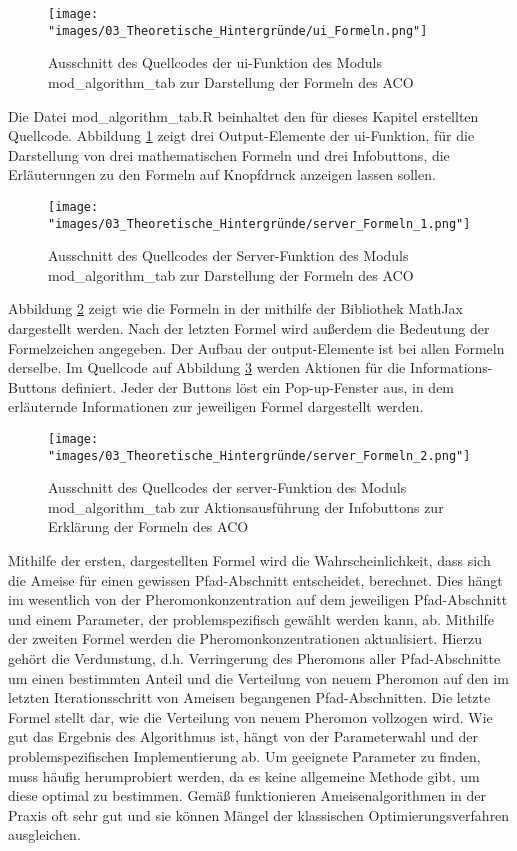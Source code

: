 \begin{figure}[h]
 \centering
 \texttt{[image: "images/03\_Theoretische\_Hintergründe/ui\_Formeln.png"]}
 \caption{Ausschnitt des Quellcodes der ui-Funktion des Moduls mod\_algorithm\_tab zur Darstellung der Formeln des ACO}
 \label{fig:formeln_ui}
\end{figure}

Die Datei mod\_algorithm\_tab.R beinhaltet den für dieses Kapitel erstellten Quellcode.
Abbildung \ref{fig:formeln_ui} zeigt drei Output-Elemente der ui-Funktion, für die Darstellung von drei mathematischen Formeln und drei Infobuttons, die Erläuterungen zu den Formeln auf Knopfdruck anzeigen lassen sollen.

\begin{figure}[h]
 \centering
 \texttt{[image: "images/03\_Theoretische\_Hintergründe/server\_Formeln\_1.png"]}
 \caption{Ausschnitt des Quellcodes der Server-Funktion des Moduls mod\_algorithm\_tab zur Darstellung der Formeln des ACO}
 \label{fig:formeln_server_1}
\end{figure}

Abbildung \ref{fig:formeln_server_1} zeigt wie die Formeln in der mithilfe der Bibliothek MathJax dargestellt werden. Nach der letzten Formel wird außerdem die Bedeutung der Formelzeichen angegeben. Der Aufbau der output-Elemente ist bei allen Formeln derselbe. 
Im Quellcode auf Abbildung \ref{fig:formeln_server_2} werden Aktionen für die Informations-Buttons definiert. Jeder der Buttons löst ein Pop-up-Fenster aus, in dem erläuternde Informationen zur jeweiligen Formel dargestellt werden.

\begin{figure}[h]
 \centering
 \texttt{[image: "images/03\_Theoretische\_Hintergründe/server\_Formeln\_2.png"]}
 \caption{Ausschnitt des Quellcodes der server-Funktion des Moduls mod\_algorithm\_tab zur Aktionsausführung der Infobuttons zur Erklärung der Formeln des ACO}
 \label{fig:formeln_server_2}
\end{figure}

Mithilfe der ersten, dargestellten Formel wird die Wahrscheinlichkeit, dass sich die Ameise für einen gewissen Pfad-Abschnitt entscheidet, berechnet. Dies hängt im wesentlich von der Pheromonkonzentration auf dem jeweiligen Pfad-Abschnitt und einem Parameter, der problemspezifisch gewählt werden kann, ab.
Mithilfe der zweiten Formel werden die Pheromonkonzentrationen aktualisiert. Hierzu gehört die Verdunstung, d.h. Verringerung des Pheromons aller Pfad-Abschnitte um einen bestimmten Anteil und die Verteilung von neuem Pheromon auf den im letzten Iterationsschritt von Ameisen begangenen Pfad-Abschnitten. 
Die letzte Formel stellt dar, wie die Verteilung von neuem Pheromon vollzogen wird. 
\newline 
Wie gut das Ergebnis des Algorithmus ist, hängt von der Parameterwahl und der problemspezifischen Implementierung ab. Um geeignete Parameter zu finden, muss häufig \glqq herumprobiert\grqq{} werden, da es keine allgemeine Methode gibt, um diese optimal zu bestimmen.
Gemäß \citet{Pyl2008} funktionieren Ameisenalgorithmen in der Praxis  oft sehr gut und sie können Mängel der klassischen Optimierungsverfahren ausgleichen.

